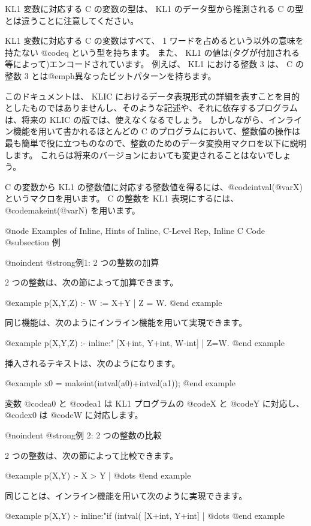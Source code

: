 {KL1 変数に対応する C の変数の型は、 KL1 のデータ型から推測される C の型とは違うことに注意してください。

KL1 変数に対応する C の変数はすべて、 1 ワードを占めるという以外の意味を持たない @code{q} という型を持ちます。
また、 KL1 の値は(タグが付加される等によって)エンコードされています。
例えば、 KL1 における整数 3 は、 C の整数 3 とは@emph{異なった}ビットパターンを持ちます。

このドキュメントは、 KLIC におけるデータ表現形式の詳細を表すことを目的としたものではありませんし、そのような記述や、それに依存するプログラムは、将来の KLIC の版では、使えなくなるでしょう。
しかしながら、インライン機能を用いて書かれるほとんどの C のプログラムにおいて、整数値の操作は最も簡単で役に立つものなので、整数のためのデータ変換用マクロを以下に説明します。
これらは将来のバージョンにおいても変更されることはないでしょう。

C の変数から KL1 の整数値に対応する整数値を得るには、@code{intval(@var{X})} というマクロを用います。
C の整数を KL1 表現にするには、@code{makeint(@var{N})} を用います。

@node Examples of Inline, Hints of Inline, C-Level Rep, Inline C Code
@subsection 例

@noindent
@strong{例1: 2 つの整数の加算}

 2 つの整数は、次の節によって加算できます。

@example
    p(X,Y,Z) :- W := X+Y | Z = W.
@end example

同じ機能は、次のようにインライン機能を用いて実現できます。

@example
p(X,Y,Z) :-
  inline:"%
    [X+int, Y+int, W-int] | Z=W.
@end example

挿入されるテキストは、次のようになります。

@example
x0 = makeint(intval(a0)+intval(a1));
@end example

変数 @code{a0} と @code{a1} は KL1 プログラムの @code{X} と @code{Y} に対応し、 @code{x0} は @code{W} に対応します。

@noindent
@strong{例 2: 2 つの整数の比較}

 2 つの整数は、次の節によって比較できます。

@example
p(X,Y) :- X > Y | @dots{}
@end example

同じことは、インライン機能を用いて次のように実現できます。

@example
p(X,Y) :-
  inline:"if (intval(%
    [X+int, Y+int] | @dots{}
@end example

}
